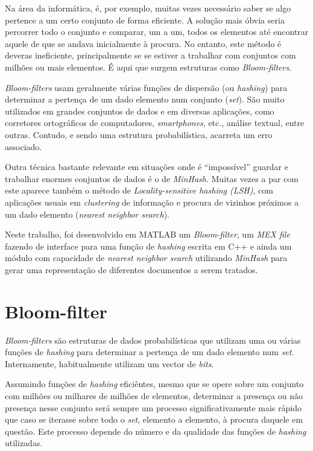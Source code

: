 \documentclass[a4paper,11pt,openright,oneside]{report}
\begin{document}
Na área da informática, é, por exemplo, muitas vezes necessário saber se algo pertence a um certo conjunto de forma eficiente. A solução mais óbvia seria percorrer todo o conjunto e comparar, um a um, todos os elementos até encontrar aquele de que se andava inicialmente à procura. No entanto, este método é deveras ineficiente, principalmente se se estiver a trabalhar com conjuntos com milhões ou mais elementos. É aqui que surgem estruturas como \textit{Bloom-filters}. 

\textit{Bloom-filters} usam geralmente várias funções de dispersão (ou \textit{hashing}) para determinar a pertença de um dado elemento num conjunto (\textit{set}). São muito utilizados em grandes conjuntos de dados e em diversas aplicações, como corretores ortográficos de computadores, \textit{smartphones}, etc., análise textual, entre outras. Contudo, e sendo uma estrutura probabilística, acarreta um erro associado.

Outra técnica bastante relevante em situações onde é ``impossível'' guardar e trabalhar enormes conjuntos de dados é o de \textit{MinHash}. Muitas vezes a par com este aparece também o método de \textit{Locality-sensitive hashing (LSH)}, com aplicações usuais em \textit{clustering} de informação e procura de vizinhos próximos a um dado elemento (\textit{nearest neighbor search}).

Neste trabalho, foi desenvolvido em MATLAB um \textit{Bloom-filter}, um \textit{MEX file} fazendo de interface para uma função de \textit{hashing} escrita em C++ e ainda um módulo com capacidade de \textit{nearest neighbor search} utilizando \textit{MinHash} para gerar uma representação de diferentes documentos a serem tratados.

\chapter{Bloom-filter}
\label{chap.bloom}

\textit{Bloom-filters} são estruturas de dados probabilísticas que utilizam uma ou várias funções de \textit{hashing} para determinar a pertença de um dado elemento num \textit{set}. Internamente, habitualmente utilizam um vector de \textit{bits}.

Assumindo funções de \textit{hashing} eficiêntes, mesmo que se opere sobre um conjunto com milhões ou milhares de milhões de elementos, determinar a presença ou não presença nesse conjunto será sempre um processo significativamente mais rápido que caso se iterasse sobre todo o \textit{set}, elemento a elemento, à procura daquele em questão. Este processo depende do número e da qualidade das funções de \textit{hashing} utilizadas.
\end{document}
